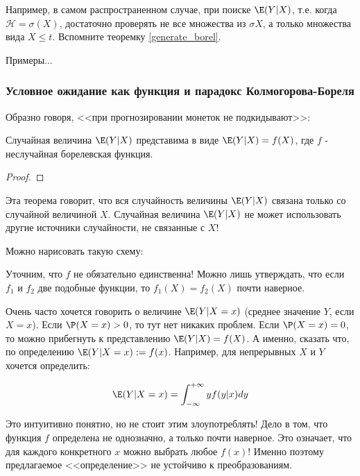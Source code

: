 {\begin{itemize}
Например, в самом распространенном случае, при поиске $\E(Y|X)$, т.е. когда $\mathcal{H}=\sigma(X)$, достаточно проверять не все множества из $\sigma{X}$, а только множества вида $X\leq t$. Вспомните теоремку \ref{generate_borel}.



\end{itemize}

Примеры...


\subsubsection*{Условное ожидание как функция и парадокс Колмогорова-Бореля}

Образно говоря, <<при прогнозировании монеток не подкидывают>>:
\begin{myth} \label{e_cond_as_f}
Случайная величина $\E(Y|X)$ представима в виде $\E(Y|X)=f(X)$, где $f$ - неслучайная борелевская функция.
\end{myth}
\begin{proof}

\end{proof}
Эта теорема говорит, что вся случайность величины $\E(Y|X)$ связана только со случайной величиной $X$. Случайная величина $\E(Y|X)$ не может использовать другие источники случайности, не связанные с $X$!

Можно нарисовать такую схему:



Уточним, что $f$ не обязательно единственна! Можно лишь утверждать, что если $f_{1}$ и $f_{2}$ две подобные функции, то $f_{1}(X)=f_{2}(X)$ почти наверное.

Очень часто хочется говорить о величине $\E(Y|X=x)$ (среднее значение $Y$, если $X=x$). Если $\P(X=x)>0$, то тут нет никаких проблем. Если $\P(X=x)=0$, то можно прибегнуть к представлению $\E(Y|X)=f(X)$. А именно, сказать что, по определению $\E(Y|X=x):=f(x)$. Например, для непрерывных $X$ и $Y$ хочется определить:

\begin{equation}
\E(Y|X=x)=\int_{-\infty}^{+\infty}yf(y|x)dy
\end{equation}

Это интуитивно понятно, но не стоит этим злоупотреблять! Дело в том, что функция $f$ определена не однозначно, а только почти наверное. Это означает, что для каждого конкретного $x$ можно выбрать любое $f(x)$! Именно поэтому предлагаемое <<определение>> не устойчиво к преобразованиям.

}
